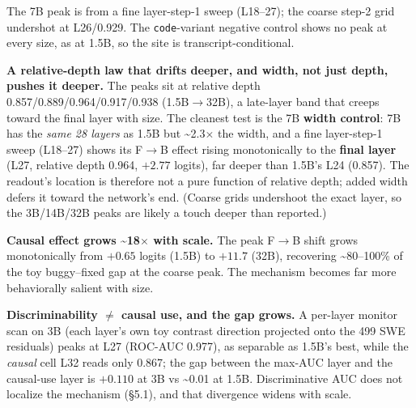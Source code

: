 \documentclass[
  11pt,
  a4paper]{article}
\begin{document}
The 7B peak is from a fine layer-step-1 sweep (L18--27); the coarse
step-2 grid undershot at L26/0.929. The \texttt{code}-variant negative
control shows no peak at every size, as at 1.5B, so the site is
transcript-conditional.

\textbf{A relative-depth law that drifts deeper, and width, not just
depth, pushes it deeper.} The peaks sit at relative depth
0.857/0.889/0.964/0.917/0.938 (1.5B\ensuremath{\rightarrow}32B), a late-layer band that creeps
toward the final layer with size. The cleanest test is the 7B
\textbf{width control}: 7B has the \emph{same 28 layers} as 1.5B but
\textasciitilde2.3\ensuremath{\times} the width, and a fine layer-step-1 sweep (L18--27)
shows its F\ensuremath{\rightarrow}B effect rising monotonically to the \textbf{final layer}
(L27, relative depth 0.964, \(+2.77\) logits), far deeper than 1.5B's
L24 (0.857). The readout's location is therefore not a pure function of
relative depth; added width defers it toward the network's end. (Coarse
grids undershoot the exact layer, so the 3B/14B/32B peaks are likely a
touch deeper than reported.)

\textbf{Causal effect grows \textasciitilde18\ensuremath{\times} with scale.} The peak F\ensuremath{\rightarrow}B
shift grows monotonically from \(+0.65\) logits (1.5B) to \(+11.7\)
(32B), recovering \textasciitilde80--100\% of the toy buggy--fixed gap
at the coarse peak. The mechanism becomes far more behaviorally salient
with size.

\textbf{Discriminability \(\neq\) causal use, and the gap grows.} A
per-layer monitor scan on 3B (each layer's own toy contrast direction
projected onto the 499 SWE residuals) peaks at L27 (ROC-AUC 0.977), as
separable as 1.5B's best, while the \emph{causal} cell L32 reads only
0.867; the gap between the max-AUC layer and the causal-use layer is
\(+0.110\) at 3B vs \textasciitilde0.01 at 1.5B. Discriminative AUC does
not localize the mechanism (\S{}5.1), and that divergence widens with
scale.
\end{document}
